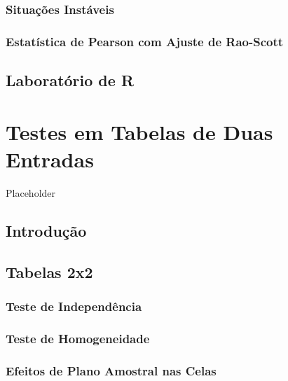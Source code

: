 \documentclass[
]{book}
\begin{document}
\hypertarget{situauxe7uxf5es-instuxe1veis}{%
\subsection{Situações Instáveis}\label{situauxe7uxf5es-instuxe1veis}}

\hypertarget{raoscott}{%
\subsection{Estatística de Pearson com Ajuste de Rao-Scott}\label{raoscott}}

\hypertarget{laboratuxf3rio-de-r-4}{%
\section{Laboratório de R}\label{laboratuxf3rio-de-r-4}}

\hypertarget{testetab2}{%
\chapter{Testes em Tabelas de Duas Entradas}\label{testetab2}}

Placeholder

\hypertarget{introduuxe7uxe3o-2}{%
\section{Introdução}\label{introduuxe7uxe3o-2}}

\hypertarget{tabelas22}{%
\section{Tabelas 2x2}\label{tabelas22}}

\hypertarget{teste-de-independuxeancia}{%
\subsection{Teste de Independência}\label{teste-de-independuxeancia}}

\hypertarget{teste-de-homogeneidade}{%
\subsection{Teste de Homogeneidade}\label{teste-de-homogeneidade}}

\hypertarget{efeitos-de-plano-amostral-nas-celas}{%
\subsection{Efeitos de Plano Amostral nas Celas}\label{efeitos-de-plano-amostral-nas-celas}}
\end{document}
